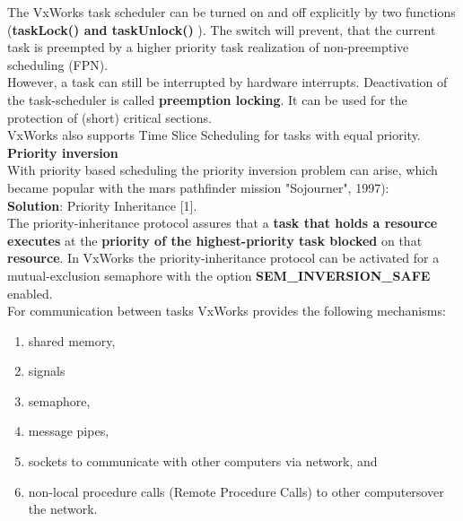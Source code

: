 The VxWorks task scheduler can be turned on and off explicitly by two functions (\textbf{taskLock() and taskUnlock()} ). The switch will prevent, that the current task is preempted by a higher priority task  realization of non-preemptive scheduling (FPN).\\

However, a task can still be interrupted by hardware interrupts. Deactivation of the task-scheduler is called \textbf{preemption locking}. It can be used for the protection of (short) critical sections.\\

VxWorks also supports Time Slice Scheduling for tasks with equal priority.\\

{\rot\bf Priority inversion}\\

With priority based scheduling the priority inversion problem can arise, which became popular with the mars pathfinder mission "Sojourner", 1997): \\

\textbf{Solution}: Priority Inheritance [1].\\

The priority-inheritance protocol assures that a\textbf{ task that holds a resource executes} at the \textbf{priority of the highest-priority task blocked} on that \textbf{resource}. In VxWorks the priority-inheritance protocol can be activated for a mutual-exclusion semaphore with the option \textbf{SEM\_INVERSION\_SAFE} enabled. \\

For communication between tasks VxWorks provides the following mechanisms:

\begin{enumerate}
\item  shared memory,

\item  signals

\item  semaphore,

\item  message pipes,

\item  sockets to communicate with other computers via network, and

\item  non-local procedure calls (Remote Procedure Calls) to other computersover the network.
\end{enumerate}

